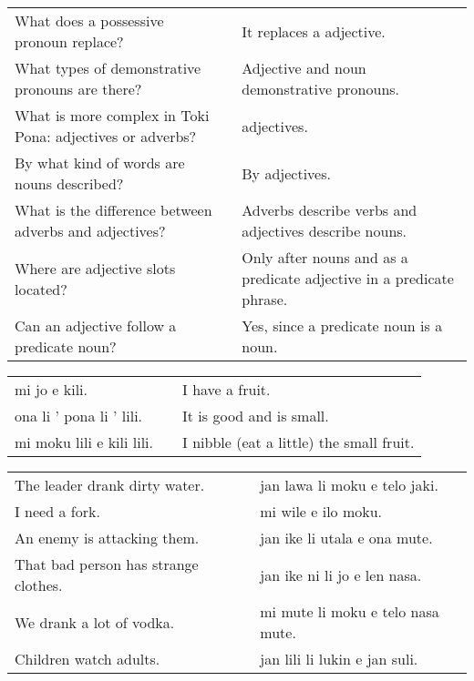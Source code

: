 \begin{supertabular}{p{5,5cm}|ll}
    What does a possessive pronoun replace?                   &  & It replaces a adjective.                                             \\
    What types of demonstrative pronouns are there?           &  & Adjective and noun demonstrative pronouns.                           \\
    What is more complex in Toki Pona: adjectives or adverbs? &  & adjectives.                                                          \\
    By what kind of words are nouns described?                &  & By adjectives.                                                       \\
    What is the difference between adverbs and adjectives?    &  & Adverbs describe verbs and adjectives describe nouns.                \\
    Where are adjective slots located?                        &  & Only after nouns and as a predicate adjective in a predicate phrase. \\
    Can an adjective follow a predicate noun?                 &  & Yes, since a predicate noun is a noun.                               \\
\end{supertabular}

\begin{supertabular}{p{5,5cm}|ll}
    mi jo e kili.             &  & I have a fruit.                          \\
    ona li ' pona li ' lili.  &  & It is good and is small.                 \\
    mi moku lili e kili lili. &  & I nibble (eat a little) the small fruit. \\
\end{supertabular}

\begin{supertabular}{p{5,5cm}|ll}
    The leader drank dirty water.        &  & jan lawa li moku e telo jaki.     \\
    I need a fork.                       &  & mi wile e ilo moku.               \\
    An enemy is attacking them.          &  & jan ike li utala e ona mute.      \\
    That bad person has strange clothes. &  & jan ike ni li jo e len nasa.      \\
    We drank a lot of vodka.             &  & mi mute li moku e telo nasa mute. \\
    Children watch adults.               &  & jan lili li lukin e jan suli.     \\
\end{supertabular}


